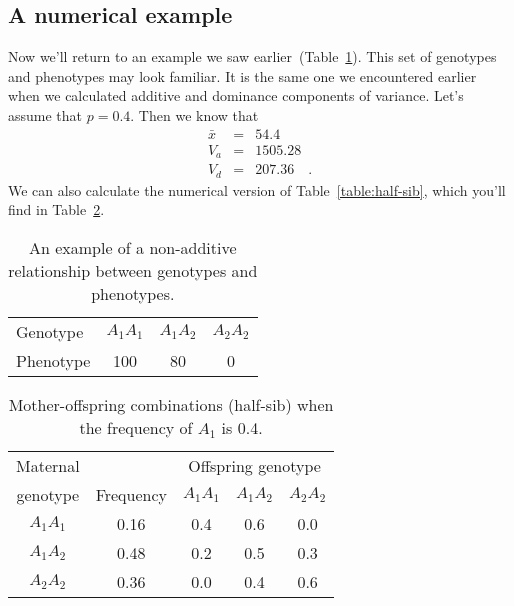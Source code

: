 \subsection*{A numerical example}

Now we'll return to an example we saw
earlier~(Table~\ref{table:example}). This set of genotypes and
phenotypes may look familiar. It is the same one we encountered
earlier when we calculated additive and dominance components of
variance. Let's assume that $p = 0.4$. Then we know that
\begin{eqnarray*}
\bar x &=& 54.4 \\
V_a &=& 1505.28 \\
V_d &=& 207.36 \quad .
\end{eqnarray*}
We can also calculate the numerical version of
Table~\ref{table:half-sib}, which you'll find in
Table~\ref{table:example-hs}.

\begin{table}
\begin{center}
\begin{tabular}{l|ccc}
\hline\hline
Genotype  & $A_1A_1$ & $A_1A_2$ & $A_2A_2$ \\
Phenotype & 100        & 80      & 0 \\
\hline
\end{tabular}
\end{center}
\caption{An example of a non-additive relationship between genotypes
  and phenotypes.}\label{table:example}
\end{table}

\begin{table}
\begin{center}
\begin{tabular}{c|c|ccc}
\hline\hline
Maternal &           & \multicolumn{3}{c}{Offspring genotype} \\
genotype & Frequency & $A_1A_1$ & $A_1A_2$ & $A_2A_2$ \\
\hline
$A_1A_1$ & 0.16      & 0.4      & 0.6      & 0.0 \\
$A_1A_2$ & 0.48      & 0.2      & 0.5      & 0.3 \\
$A_2A_2$ & 0.36      & 0.0      & 0.4      & 0.6 \\
\hline
\end{tabular}
\end{center}
\caption{Mother-offspring combinations (half-sib) when the frequency
  of $A_1$ is 0.4.}\label{table:example-hs}
\end{table}

